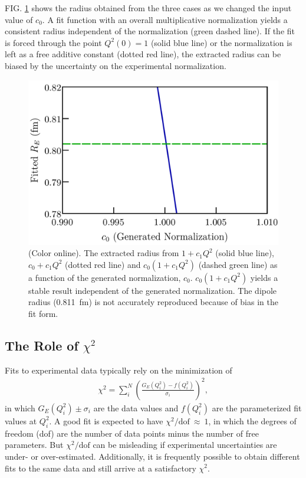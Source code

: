\documentclass[aps,prd,twocolumn,groupedaddress,10pt]{revtex4-1}
\begin{document}
FIG. \ref{normalization} shows the radius obtained from the three cases as we changed the input value of $c_0$. A fit function with an overall multiplicative normalization yields a consistent radius independent of the normalization (green dashed line). If the fit is forced through the point $Q^2(0)=1$ (solid blue line) or  the normalization is left as a free additive constant (dotted red line), the extracted radius can be biased by the uncertainty on the experimental normalization. 
\begin{figure}[h!]
\includegraphics[scale=0.41]{normalization.pdf}
\caption{(Color online). The extracted radius from $1+c_1Q^2$ (solid blue line), $c_0+c_1 Q^2$ (dotted red line) and $c_0(1+c_1 Q^2)$ (dashed green line) as a function of the generated normalization, $c_0$. $c_0(1+c_1 Q^2)$ yields a stable result independent of the generated normalization. The dipole radius (0.811~fm) is not accurately reproduced because of bias in the fit form.}
\label{normalization}
\end{figure}

\subsection{The Role of $\chi^2$}

Fits to experimental data typically rely on the minimization of
\begin{align}
\chi^2 = \sum_i^N \left(\frac{G_E\left(Q_i^2 \right) - f(Q_i^2)}{\sigma_i} \right)^2,
\end{align}
in which $G_E(Q_i^2)\pm \sigma_i$ are the data values and $f(Q_i^2)$ are the parameterized fit values at $Q_i^2$. A good fit is expected to have $\chi^2/\text{dof}~\approx~1$, in which the degrees of freedom (dof) are the number of data points minus the number of free parameters. But $\chi^2/\text{dof}$ can be misleading if experimental uncertainties are under- or over-estimated. Additionally, it is frequently possible to obtain different fits to the same data and still arrive at a satisfactory $\chi^2$. 
\end{document}
